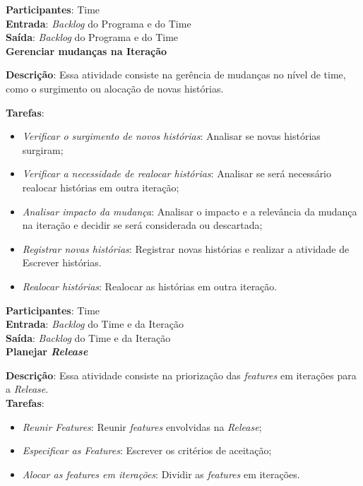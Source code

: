   \textbf{Participantes}: Time\\

  \textbf{Entrada}: \textit{Backlog} do Programa e do Time \\

  \textbf{Saída}:  \textit{Backlog} do Programa e do Time \\
  

\textbf{Gerenciar mudanças na Iteração}

  \textbf{Descrição}: Essa atividade consiste na gerência de mudanças no nível de time, como o surgimento ou alocação de novas histórias.

  \textbf{Tarefas}:
  \begin{itemize}
   \item \indent \textit{Verificar o surgimento de novos histórias}: Analisar se novas histórias surgiram;

   \item \indent \textit{Verificar a necessidade de realocar histórias}: Analisar se será necessário realocar histórias em outra iteração;
   
   \item \indent \textit{Analisar impacto da mudança}: Analisar o impacto e a relevância da mudança na iteração e decidir se será considerada
   ou descartada;

   \item \indent \textit{Registrar novas histórias}: Registrar novas histórias e realizar a atividade de Escrever histórias.

   \item \indent \textit{Realocar histórias}: Realocar as histórias em outra iteração.
  \end{itemize}

  \textbf{Participantes}: Time\\

  \textbf{Entrada}: \textit{Backlog} do Time e da Iteração\\

  \textbf{Saída}:  \textit{Backlog} do Time e da Iteração\\
  

\textbf{Planejar \textit{Release}}

  \textbf{Descrição}: Essa atividade consiste na priorização das \textit{features} em iterações para a \textit{Release}. \\

  \textbf{Tarefas}:
  \begin{itemize}
   \item \indent \textit{Reunir \textit{Features}}: Reunir \textit{features} envolvidas na \textit{Release};

   \item \indent \textit{Especificar as \textit{Features}}: Escrever os critérios de aceitação;

   \item \indent \textit{Alocar as \textit{features} em iterações}: Dividir as \textit{features} em iterações.
  \end{itemize}

